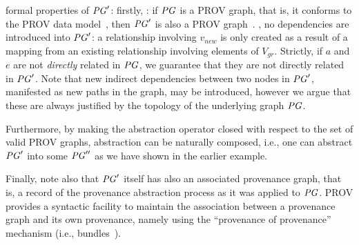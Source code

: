  formal properties of $\mathit{PG}'$: firstly, : if $\mathit{PG}$ is a  PROV graph, that is, it conforms to the PROV data model~\citep{w3c-prov-dm}, then $\mathit{PG}'$ is also a  PROV graph~. %
, no   dependencies are introduced into $\mathit{PG}'$: a  relationship involving $v_{new}$ is only created as a result of a mapping from an existing relationship involving elements of $V_{gr}$. Strictly, if $a$ and $e$ are not \textit{directly} related in $\mathit{PG}$, we guarantee that they are not directly related in $\mathit{PG}'$.  Note that new indirect dependencies between two nodes in $\mathit{PG}'$, manifested as new paths in the graph, may be introduced, however we argue that these are always justified by the topology of the underlying graph $\mathit{PG}$.

 



Furthermore, by making the abstraction operator closed with respect to the set of valid PROV graphs, abstraction can be naturally composed, i.e.,  one can abstract $\mathit{PG}'$ into some $\mathit{PG}''$ as we have shown in the earlier example.

%
Finally, note also that $\mathit{PG}'$ itself has also an associated provenance graph, that is, a record of the provenance abstraction process as it was applied to $\mathit{PG}$. 
PROV provides a syntactic facility to maintain the association between a provenance graph and its own provenance, namely using the ``provenance of provenance'' mechanism (i.e., bundles~\citep{w3c-prov-dm}).


